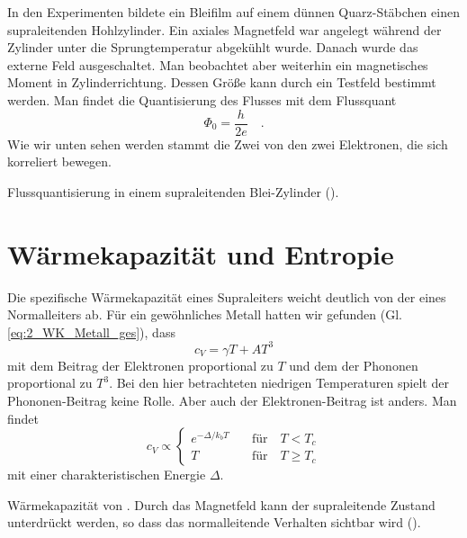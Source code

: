 In den Experimenten bildete ein Bleifilm auf einem dünnen Quarz-Stäbchen einen  supraleitenden Hohlzylinder. Ein axiales Magnetfeld war angelegt während der Zylinder unter die Sprungtemperatur abgekühlt wurde. Danach wurde das externe Feld ausgeschaltet. Man beobachtet aber weiterhin ein magnetisches Moment in Zylinderrichtung. Dessen Größe kann durch ein Testfeld bestimmt werden. Man findet die Quantisierung des Flusses mit dem Flussquant
\begin{equation}
    \Phi_0 = \frac{h}{2 e} \quad .
\end{equation}
Wie wir unten sehen werden stammt die Zwei von den zwei Elektronen, die sich korreliert bewegen.

\begin{marginfigure}
    \caption{Flussquantisierung in einem supraleitenden Blei-Zylinder (\cite{Doll1961}).}
\end{marginfigure}




\section*{Wärmekapazität und Entropie}

Die spezifische Wärmekapazität eines Supraleiters weicht deutlich von der eines Normalleiters ab. Für ein gewöhnliches Metall hatten wir gefunden (Gl. \ref{eq:2_WK_Metall_ges}), dass  
\begin{equation}
    c_V = \gamma T + A T^3
\end{equation}
mit dem Beitrag der Elektronen proportional zu $T$ und dem der Phononen proportional zu $T^3$. Bei den hier betrachteten niedrigen Temperaturen spielt der Phononen-Beitrag keine Rolle. Aber auch der Elektronen-Beitrag ist anders. Man findet
\begin{equation}
    c_V \propto 
    \left\{
   \begin{matrix}
    e^{- \Delta / k_b T} \quad & \text{für} \quad T < T_c \\
    T  & \text{für} \quad T \ge T_c 
   \end{matrix}
    \right.
\end{equation}
mit einer charakteristischen  Energie $\Delta$.


\begin{marginfigure}
    \caption{Wärmekapazität  von . Durch das Magnetfeld kann der supraleitende Zustand unterdrückt werden, so dass das  normalleitende Verhalten sichtbar wird (\cite{Phillips1959}).}
\end{marginfigure}



